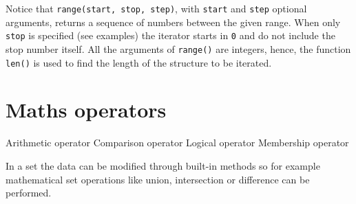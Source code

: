 Notice that \texttt{range(start, stop, step)}, with \texttt{start} and \texttt{step} optional arguments, returns a sequence of numbers between the given range.
When only \texttt{stop} is specified (see examples) the iterator starts in \texttt{0} and do not include the stop number itself.
All the arguments of \texttt{range()} are integers, hence, the function \texttt{len()} is used to find the length of the structure to be iterated. 




 

 











\newpage
    \section{Maths operators}
    
    
Arithmetic operator 
Comparison operator 
Logical operator 
Membership operator 



In a set the data can be modified through built-in methods so for example mathematical set operations like union, intersection or difference can be performed.



